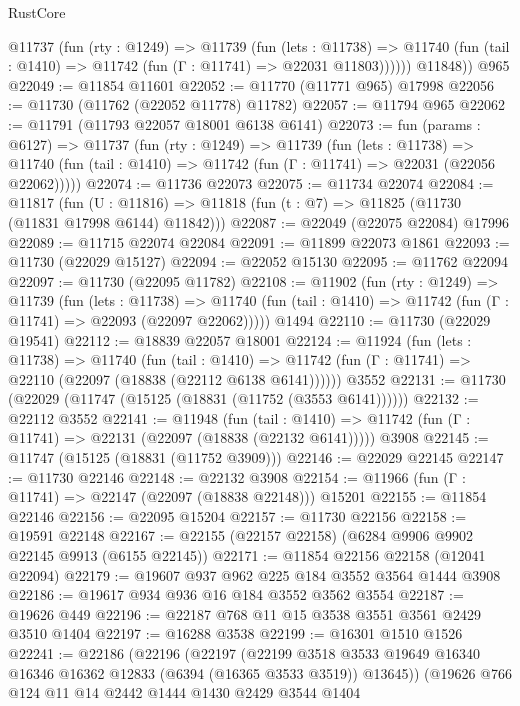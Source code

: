 \begin{lexlean}{RustCore}
\begin{coremodule}
          @11737
            (fun (rty : @1249) =>
            @11739
              (fun (lets : @11738) =>
              @11740 (fun (tail : @1410) => @11742 (fun (Γ : @11741) => @22031 @11803))))))
        @11848))
    @965
@22049 := @11854 @11601
@22052 := @11770 (@11771 @965) @17998
@22056 := @11730 (@11762 (@22052 @11778) @11782)
@22057 := @11794 @965
@22062 := @11791 (@11793 @22057 @18001 @6138 @6141)
@22073 := fun (params : @6127) =>
  @11737
    (fun (rty : @1249) =>
    @11739
      (fun (lets : @11738) =>
      @11740 (fun (tail : @1410) => @11742 (fun (Γ : @11741) => @22031 (@22056 @22062)))))
@22074 := @11736 @22073
@22075 := @11734 @22074
@22084 := @11817
    (fun (U : @11816) => @11818 (fun (t : @7) => @11825 (@11730 (@11831 @17998 @6144) @11842)))
@22087 := @22049 (@22075 @22084) @17996
@22089 := @11715 @22074 @22084
@22091 := @11899 @22073 @1861
@22093 := @11730 (@22029 @15127)
@22094 := @22052 @15130
@22095 := @11762 @22094
@22097 := @11730 (@22095 @11782)
@22108 := @11902
    (fun (rty : @1249) =>
    @11739
      (fun (lets : @11738) =>
      @11740 (fun (tail : @1410) => @11742 (fun (Γ : @11741) => @22093 (@22097 @22062)))))
    @1494
@22110 := @11730 (@22029 @19541)
@22112 := @18839 @22057 @18001
@22124 := @11924
    (fun (lets : @11738) =>
    @11740
      (fun (tail : @1410) =>
      @11742 (fun (Γ : @11741) => @22110 (@22097 (@18838 (@22112 @6138 @6141))))))
    @3552
@22131 := @11730 (@22029 (@11747 (@15125 (@18831 (@11752 (@3553 @6141))))))
@22132 := @22112 @3552
@22141 := @11948
    (fun (tail : @1410) => @11742 (fun (Γ : @11741) => @22131 (@22097 (@18838 (@22132 @6141)))))
    @3908
@22145 := @11747 (@15125 (@18831 (@11752 @3909)))
@22146 := @22029 @22145
@22147 := @11730 @22146
@22148 := @22132 @3908
@22154 := @11966 (fun (Γ : @11741) => @22147 (@22097 (@18838 @22148))) @15201
@22155 := @11854 @22146
@22156 := @22095 @15204
@22157 := @11730 @22156
@22158 := @19591 @22148
@22167 := @22155 (@22157 @22158) (@6284 @9906 @9902 @22145 @9913 (@6155 @22145))
@22171 := @11854 @22156 @22158 (@12041 @22094)
@22179 := @19607 @937 @962 @225 @184 @3552 @3564 @1444 @3908
@22186 := @19617 @934 @936 @16 @184 @3552 @3562 @3554
@22187 := @19626 @449
@22196 := @22187 @768 @11 @15 @3538 @3551 @3561 @2429 @3510 @1404
@22197 := @16288 @3538
@22199 := @16301 @1510 @1526
@22241 := @22186
    (@22196
      (@22197
        (@22199 @3518 @3533 @19649 @16340 @16346 @16362 @12833 (@6394 (@16365 @3533 @3519)) @13645))
      (@19626
        @766
        @124
        @11
        @14
        @2442
        @1444
        @1430
        @2429
        @3544
        @1404

\end{coremodule}
\end{lexlean}
